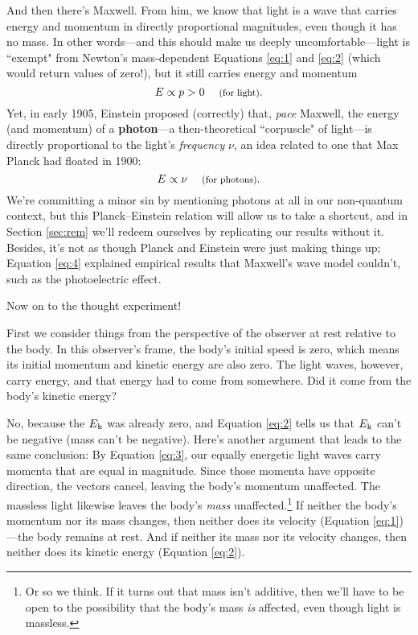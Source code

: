 \documentclass[12pt]{article}
\begin{document}
And then there's Maxwell. From him, we know that light is a wave that carries energy and momentum in directly proportional magnitudes, even though it has no mass. In other words---and this should make us deeply uncomfortable---light is ``exempt" from Newton's mass-dependent Equations \ref{eq:1} and \ref{eq:2} (which would return values of zero!), but it still carries energy and momentum
\begin{equation}\label{eq:3}
E \propto p >0 \quad \text{\footnotesize{ (for light)}} .
\end{equation}
Yet, in early 1905, Einstein proposed (correctly) that, \emph{pace} Maxwell, the energy (and momentum) of a \textbf{photon}---a then-theoretical ``corpuscle" of light---is directly proportional to the light's \emph{frequency} $\nu$, an idea related to one that Max Planck had floated in 1900:
\begin{equation}\label{eq:4}
E \propto \nu \quad \text{\footnotesize{ (for photons)}}.
\end{equation}
We're committing a minor sin by mentioning photons at all in our non-quantum context, but this Planck--Einstein relation will allow us to take a shortcut, and in Section \ref{sec:rem} we'll redeem ourselves by replicating our results without it. Besides, it's not as though Planck and Einstein were just making things up; Equation \ref{eq:4} explained empirical results that Maxwell's wave model couldn't, such as the photoelectric effect.

Now on to the thought experiment!

First we consider things from the perspective of the observer at rest relative to the body. In this observer's frame, the body's initial speed is zero, which means its initial momentum and kinetic energy are also zero. The light waves, however, carry energy, and that energy had to come from somewhere. Did it come from the body's kinetic energy?

No, because the $E_{\mkern.5mu \textrm{k}}$ was already zero, and Equation \ref{eq:2} tells us that $E_{\mkern.5mu \textrm{k}}$ can't be negative (mass can't be negative). Here's another argument that leads to the same conclusion: By Equation \ref{eq:3}, our equally energetic light waves carry momenta that are equal in magnitude. Since those momenta have opposite direction, the vectors cancel, leaving the body's momentum unaffected. The massless light likewise leaves the body's \emph{mass} unaffected.\footnote{\label{fn:ma}Or so we think. If it turns out that mass isn't additive, then we'll have to be open to the possibility that the body's mass \emph{is} affected, even though light is massless.} If neither the body's momentum nor its mass changes, then neither does its velocity (Equation \ref{eq:1})---the body remains at rest. And if neither its mass nor its velocity changes, then neither does its kinetic energy (Equation \ref{eq:2}).
\end{document}
